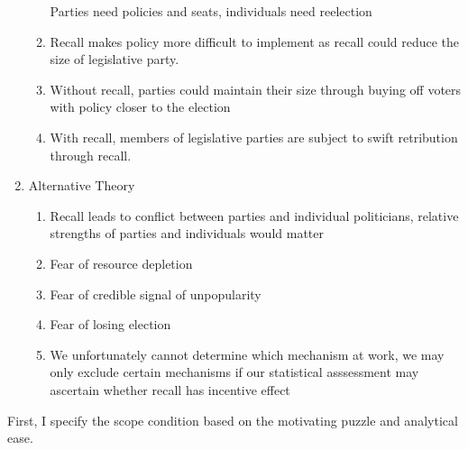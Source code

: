 \documentclass[hyphens, crop=false]{standalone}
\begin{document}
\begin{enumerate}
\begin{enumerate}
			Parties need policies and seats, individuals need reelection
			\item 
			Recall makes policy more difficult to implement
			as recall could reduce the size of legislative party.
			\item 
			Without recall, parties could maintain their size through buying off voters with policy closer to the election
			\item 
			With recall, members of legislative parties are subject to swift retribution through recall.
		\end{enumerate}
		\item 
		Alternative Theory
		\begin{enumerate}
			\item 
			Recall leads to conflict between parties and individual politicians, relative strengths of parties and individuals would matter
			\item 
			Fear of resource depletion
			\item 
			Fear of credible signal of unpopularity
			\item 
			Fear of losing election
			\item 
			We unfortunately cannot determine which mechanism at work, we may only exclude certain mechanisms if our statistical asssessment may ascertain whether recall has incentive effect
		\end{enumerate}
	\end{enumerate}
	
	First, I specify the scope condition based on the motivating puzzle and analytical ease.
	
\end{document}
